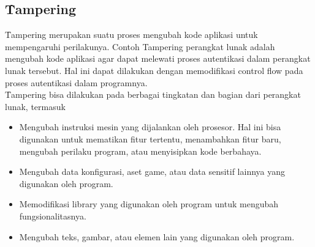 \subsection{\f{Tampering}}
\f{Tampering} merupakan suatu proses mengubah kode aplikasi untuk mempengaruhi perilakunya. Contoh Tampering perangkat lunak adalah mengubah kode aplikasi agar dapat melewati proses autentikasi dalam perangkat lunak tersebut. Hal ini dapat dilakukan dengan memodifikasi control flow pada proses autentikasi dalam programnya. \\
\f{Tampering} bisa dilakukan pada berbagai tingkatan dan bagian dari perangkat lunak, termasuk
\begin{itemize}
	\item {} Mengubah instruksi mesin yang dijalankan oleh prosesor. Hal ini bisa digunakan untuk mematikan fitur tertentu, menambahkan fitur baru, mengubah perilaku program, atau menyisipkan kode berbahaya.
	\item {} Mengubah data konfigurasi, aset game, atau data sensitif lainnya yang digunakan oleh program.
	\item {} Memodifikasi library yang digunakan oleh program untuk mengubah fungsionalitasnya.
	\item {} Mengubah teks, gambar, atau elemen lain yang digunakan oleh program.
\end{itemize}


